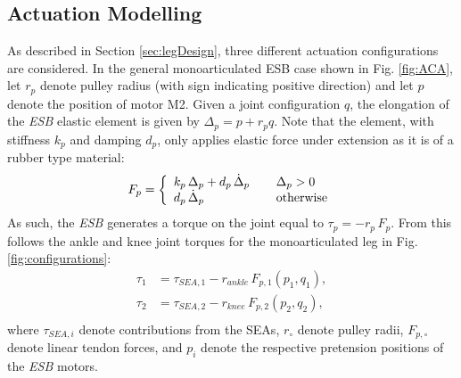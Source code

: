 \documentclass[letterpaper, 10 pt, conference]{ieeeconf}  %
\begin{document}
\subsection{Actuation Modelling}
\label{subsec:actuationModel}
As described in Section \ref{sec:legDesign}, three different actuation configurations are considered. In the general monoarticulated ESB case shown in Fig. \ref{fig:ACA}, let $r_p$ denote pulley radius (with sign indicating positive direction) and let $p$ denote the position of motor M2. Given a joint configuration $q$, the elongation of the \textit{ESB} elastic element is given by $\Delta_p = p + r_p q$. Note that the element, with stiffness $k_p$ and damping $d_p$, only applies elastic force under extension as it is of a rubber type material:
\begin{equation}
	F_p = \left\lbrace
	\begin{array}{ll}
		k_p \, \Delta_p + d_p \, \dot{\Delta}_p	\hspace{0.4cm} & \Delta_p > 0\\
		d_p \, \dot{\Delta}_p & \text{otherwise}
	\end{array}
	\right.
	\label{eq:F_p}
\end{equation}   
As such, the \textit{ESB} generates a torque on the joint equal to $\tau_p = -r_p \, F_p$. From this follows the ankle and knee joint torques for the monoarticulated leg in Fig. \ref{fig:configurations}:
\begin{equation}
	\begin{aligned}
		\tau_1 &= \tau_{SEA,1} - r_{ankle} \, F_{p,1} \left( p_1,q_1 \right), \\
		\tau_2 &= \tau_{SEA,2} - r_{knee} \, F_{p,2} \left( p_2,q_2 \right), \\
	\end{aligned}
\end{equation}
where $\tau_{SEA,i}$ denote contributions from the SEAs, $r_\circ$ denote pulley radii, $F_{p,\circ}$ denote linear tendon forces, and $p_i$ denote the respective pretension positions of the \textit{ESB} motors.
\end{document}
